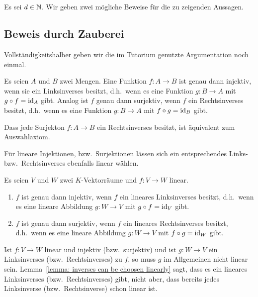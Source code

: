 \section{}
Es sei $d \in \mathbb{N}$.
Wir geben zwei mögliche Beweise für die zu zeigenden Aussagen.




\subsection{Beweis durch Zauberei}
Vollständigkeitshalber geben wir die im Tutorium genutzte Argumentation noch einmal.

\begin{recall}
  Es seien $A$ und $B$ zwei Mengen.
  Eine Funktion $f \colon A \to B$ ist genau dann injektiv, wenn sie ein Linksinverses besitzt, d.h.\ wenn es eine Funktion $g \colon B \to A$ mit $g \circ f = \operatorname{id}_A$ gibt.
  Analog ist $f$ genau dann surjektiv, wenn $f$ ein Rechtsinverses besitzt, d.h.\ wenn es eine Funktion $g \colon B \to A$ mit $f \circ g = \operatorname{id}_B$ gibt.
\end{recall}

\begin{remark}
  Dass jede Surjekton $f \colon A \to B$ ein Rechtsinverses besitzt, ist äquivalent zum Auswahlaxiom.
\end{remark}

Für lineare Injektionen, bzw.\ Surjektionen lässen sich ein entsprechendes Links- bzw.\ Rechtsinverses ebenfalls linear wählen.

\begin{lemma}
  \label{lemma: inverses can be choosen linearly}
  Es seien $V$ und $W$ zwei $K$-Vektorräume und $f \colon V \to W$ linear.
  \begin{enumerate}
    \item
      $f$ ist genau dann injektiv, wenn $f$ ein lineares Linksinverses besitzt, d.h.\ wenn es eine lineare Abbildung $g \colon W \to V$ mit $g \circ f = \operatorname{id}_V$ gibt.
    \item
      $f$ ist genau dann surjektiv, wenn $f$ ein lineares Rechtsinverses besitzt, d.h.\ wenn es eine lineare Abbildung $g \colon W \to V$ mit $f \circ g = \operatorname{id}_W$ gibt.
  \end{enumerate}
\end{lemma}

\begin{warning}
  Ist $f \colon V \to W$ linear und injektiv (bzw.\ surjektiv) und ist $g \colon W \to V$ ein Linksinverses (bzw.\ Rechtsinverses) zu $f$, so muss $g$ im Allgemeinen nicht linear sein.
  Lemma~\ref{lemma: inverses can be choosen linearly} sagt, dass es ein lineares Linksinverses (bzw.\ Rechtsinverses) gibt, nicht aber, dass bereits jedes Linksinverse (bzw.\ Rechtsinverse) schon linear ist.
\end{warning}

